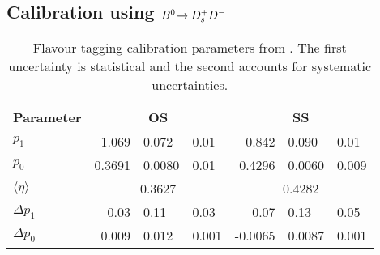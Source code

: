 
\subsection[Calibration using \texorpdfstring{$\BdToDsD$}{Bd2DsD} (2 pages)]{Calibration using \texorpdfstring{$\BdToDsD$}{Bd2DsD}}
\label{sec:dataanalysis:taggingcalibration:dsdcalibration}

\begin{table}[!htb]
\caption{Flavour tagging calibration parameters from \BdToDsD. The first
uncertainty is statistical and the second accounts for systematic
uncertainties.}
\label{tab:dataanalysis:taggingcalibration:dsdcalibration}
\centering
\begin{tabular}{lr@{$\,\pm\,$}l@{$\,\pm\,$}lr@{$\,\pm\,$}l@{$\,\pm\,$}l}
  \toprule
  Parameter           & \multicolumn{3}{c}{OS}   & \multicolumn{3}{c}{SS} \\
  \midrule
  $p_{1}$               & 1.069   & 0.072  & 0.01  & 0.842   & 0.090  & 0.01  \\
  $p_{0}$               & 0.3691  & 0.0080 & 0.01  & 0.4296  & 0.0060 & 0.009 \\
  $\langle \eta\rangle$ & \multicolumn{3}{c}{0.3627} & \multicolumn{3}{c}{0.4282} \\
  $\Delta p_{1}$        & 0.03    & 0.11   & 0.03  & 0.07    & 0.13   & 0.05  \\
  $\Delta p_{0}$        & 0.009   & 0.012  & 0.001 & -0.0065 & 0.0087 & 0.001 \\
  \bottomrule
\end{tabular}
\end{table}